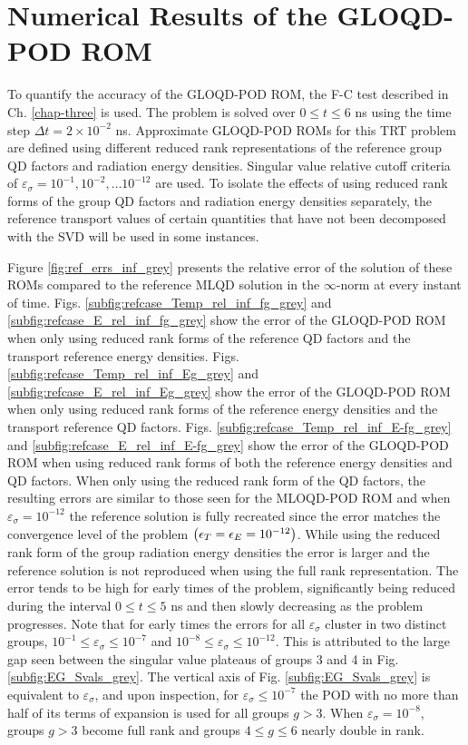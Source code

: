 \section{Numerical Results of the GLOQD-POD ROM} \label{sec:gloqd-pod_res}
	\ind To quantify the accuracy of the GLOQD-POD ROM, the F-C test described in Ch. \ref{chap-three} is used. The problem is solved over $0 \le t  \le 6$ ns using  the time step $\Delta t=2 \times 10^{-2}$ ns. Approximate GLOQD-POD ROMs for this TRT problem are defined using different reduced rank representations of the reference group QD factors and radiation energy densities. Singular value relative cutoff criteria of $\varepsilon_\sigma = 10^{-1}, 10^{-2}, \dots 10^{-12}$ are used. To isolate the effects of using reduced rank forms of the group QD factors and radiation energy densities separately, the reference transport values of certain quantities that have not been decomposed with the SVD will be used in some instances.
	
	\ind Figure \ref{fig:ref_errs_inf_grey} presents the relative error of the solution of these ROMs compared to the reference MLQD solution in the $\infty$-norm at every instant of time. Figs. \ref{subfig:refcase_Temp_rel_inf_fg_grey} and \ref{subfig:refcase_E_rel_inf_fg_grey} show the error of the GLOQD-POD ROM when only using reduced rank forms of the reference QD factors and the transport reference energy densities. Figs. \ref{subfig:refcase_Temp_rel_inf_Eg_grey} and \ref{subfig:refcase_E_rel_inf_Eg_grey} show the error of the  GLOQD-POD ROM when only using reduced rank forms of the reference energy densities and the transport reference QD factors. Figs. \ref{subfig:refcase_Temp_rel_inf_E-fg_grey} and \ref{subfig:refcase_E_rel_inf_E-fg_grey} show the error of the  GLOQD-POD ROM when using reduced rank forms of both the reference energy densities and QD factors. When only using the reduced rank form of the QD factors, the resulting errors are similar to those seen for the MLOQD-POD ROM and when $\varepsilon_\sigma = 10^{-12}$ the reference solution is fully recreated since the error matches the convergence level of the problem $\left(\epsilon_T=\epsilon_E=10^{-12}\right)$. While using the reduced rank form of the group radiation energy densities the error is larger and the reference solution is not reproduced when using the full rank representation. The error tends to be high for early times of the problem, significantly being reduced during the interval $0\leq t\leq 5$ ns and then slowly decreasing as the problem progresses. Note that for early times the errors for all $\varepsilon_\sigma$ cluster in two distinct groups, $10^{-1}\leq \varepsilon_\sigma \leq 10^{-7}$ and $10^{-8}\leq \varepsilon_\sigma \leq 10^{-12}$. This is attributed to the large gap seen between the singular value plateaus of groups 3 and 4 in Fig. \ref{subfig:EG_Svals_grey}. The vertical axis of Fig. \ref{subfig:EG_Svals_grey} is equivalent to $\varepsilon_\sigma$, and upon inspection, for $\varepsilon_\sigma\leq 10^{-7}$ the POD with no more than half of its terms of expansion is used for all groups $g>3$. When $\varepsilon_\sigma = 10^{-8}$, groups $g>3$ become full rank and groups $4\leq g \leq 6$ nearly double in rank.
	
